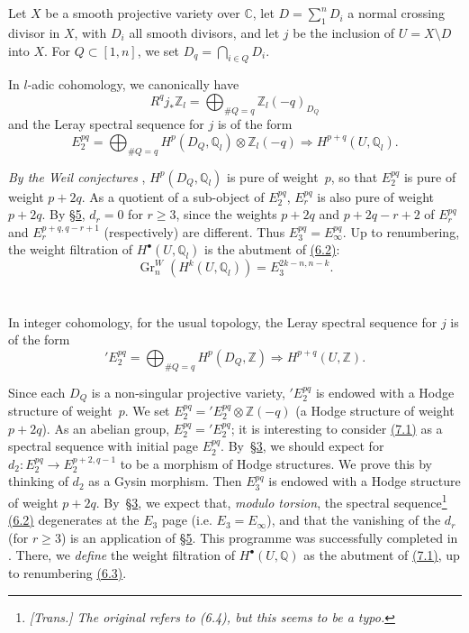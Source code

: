 \documentclass{article}
\theoremstyle{plain}
\theoremstyle{definition}
\newcommand{\ZZ}{\mathbb{Z}}
\newcommand{\QQ}{\mathbb{Q}}
\newcommand{\CC}{\mathbb{C}}
\DeclareMathOperator{\Gr}{Gr}
\renewcommand{\geq}{\geqslant}
\newcommand{\oldpage}[1]{\marginpar{\footnotesize$\Big\vert$ \textit{p.~#1}}}
\begin{document}
\section{}
\label{6}

Let $X$ be a smooth projective variety over $\CC$, let $D=\sum_1^n D_i$ a normal crossing divisor in $X$, with $D_i$ all smooth divisors, and let $j$ be the inclusion of $U=X\setminus D$ into $X$.
For $Q\subset[1,n]$, we set $D_q=\bigcap_{i\in Q}D_i$.

In $l$-adic cohomology, we canonically have
\[
  R^q j_* \ZZ_l = \bigoplus_{\#Q=q} \ZZ_l(-q)_{D_Q}
\tag{6.1}
\]
and the Leray spectral sequence for $j$ is of the form
\[
\label{6.2}
  E_2^{pq}
  = \bigoplus_{\#Q=q} H^p(D_Q,\QQ_l)\otimes\ZZ_l(-q)
  \Rightarrow H^{p+q}(U,\QQ_l).
\tag{6.2}
\]

\emph{By the Weil conjectures} \cite{5}, $H^p(D_Q,\QQ_l)$ is pure of weight~$p$, so that $E_2^{pq}$ is pure of weight $p+2q$.
As a quotient of a sub-object of $E_2^{pq}$, $E_r^{pq}$ is also pure of weight $p+2q$.
By \hyperref[5]{\S5}, $d_r=0$ for $r\geq3$, since the weights $p+2q$ and $p+2q-r+2$ of $E_r^{pq}$ and $E_r^{p+q,q-r+1}$ (respectively) are different.
Thus $E_3^{pq}=E_\infty^{pq}$.
Up to renumbering, the weight filtration of $H^\bullet(U,\QQ_l)$ is the abutment of \hyperref[6.2]{(6.2)}:
\[
\label{6.3}
  \Gr_n^W(H^k(U,\QQ_l)) = E_3^{2k-n,n-k}.
\tag{6.3}
\]


\section{}
\label{7}

In integer cohomology, for the usual topology, the Leray spectral sequence for $j$ is of the form
\[
\label{7.1}
  'E_2^{pq}
  = \bigoplus_{\#Q=q} H^p(D_Q,\ZZ)
  \Rightarrow H^{p+q}(U,\ZZ).
\tag{7.1}
\]

\oldpage{428}
Since each $D_Q$ is a non-singular projective variety, $'E_2^{pq}$ is endowed with a Hodge structure of weight~$p$.
We set $E_2^{pq}='E_2^{pq}\otimes\ZZ(-q)$ (a Hodge structure of weight $p+2q$).
As an abelian group, $E_2^{pq}='E_2^{pq}$;
it is interesting to consider \hyperref[7.1]{(7.1)} as a spectral sequence with initial page $E_2^{pq}$.
By~\hyperref[3]{\S3}, we should expect for $d_2\colon E_2^{pq}\to E_2^{p+2,q-1}$ to be a morphism of Hodge structures.
We prove this by thinking of $d_2$ as a Gysin morphism.
Then $E_3^{pq}$ is endowed with a Hodge structure of weight $p+2q$.
By~\hyperref[3]{\S3}, we expect that, \emph{modulo torsion}, the spectral sequence\footnote{\emph{[Trans.] The original refers to (6.4), but this seems to be a typo.}} \hyperref[6.2]{(6.2)} degenerates at the $E_3$ page (i.e. $E_3=E_\infty$), and that the vanishing of the $d_r$ (for $r\geq3$) is an application of \hyperref[5]{\S5}.
This programme was successfully completed in \cite[§3.2]{1}.
There, we \emph{define} the weight filtration of $H^\bullet(U,\QQ)$ as the abutment of \hyperref[7.1]{(7.1)}, up to renumbering \hyperref[6.3]{(6.3)}.
\end{document}

